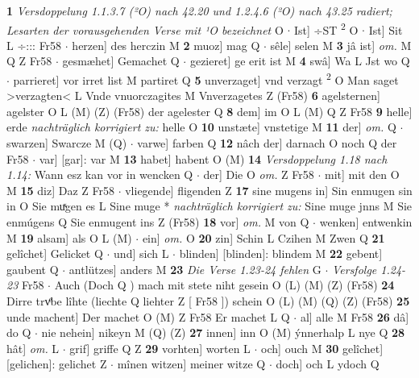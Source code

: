 \documentclass[8pt,a4paper,notitlepage]{article}
\begin{document}
\begin{table}[ht]
\begin{minipage}[t]{0.5\linewidth}
\textbf{1} \textit{Versdoppelung 1.1.3.7 (²O) nach 42.20 und 1.2.4.6 (²O) nach 43.25 radiert; Lesarten der vorausgehenden Verse mit ¹O bezeichnet} O   $\cdot$ Ist] ÷ST \textsuperscript{2}\hspace{-1.3mm} O  $\cdot$ Ist] Sit L ÷::: Fr58  $\cdot$ herzen] des herczin M \textbf{2} muoz] mag Q  $\cdot$ sêle] selen M \textbf{3} jâ ist] \textit{om.} M Q Z Fr58  $\cdot$ gesmæhet] Gemachet Q  $\cdot$ gezieret] ge erit ist M \textbf{4} swâ] Wa L Jst wo Q  $\cdot$ parrieret] vor irret list M partiret Q \textbf{5} unverzaget] vnd verzagt \textsuperscript{2}\hspace{-1.3mm} O Man saget >verzagten< L Vnde vnuorczagites M Vnverzagetes Z (Fr58) \textbf{6} agelsternen] agelster O L (M) (Z) (Fr58) der agelester Q \textbf{8} dem] im O L (M) Q Z Fr58 \textbf{9} helle] erde \textit{nachträglich korrigiert zu:} helle O \textbf{10} unstæte] vnstetige M \textbf{11} der] \textit{om.} Q  $\cdot$ swarzen] Swarcze M (Q)  $\cdot$ varwe] farben Q \textbf{12} nâch der] darnach O noch Q der Fr58  $\cdot$ var] [gar]: var M \textbf{13} habet] habent O (M) \textbf{14} \textit{Versdoppelung 1.18 nach 1.14:} Wann esz kan vor in wencken Q   $\cdot$ der] Die O \textit{om.} Z Fr58  $\cdot$ mit] mit den O M \textbf{15} diz] Daz Z Fr58  $\cdot$ vliegende] fligenden Z \textbf{17} sine mugens in] Sin enmugen sin in O Sie muͯgen es L Sine muge * \textit{nachträglich korrigiert zu:} Sine muge jnns M Sie enmúgens Q Sie enmugent ins Z (Fr58) \textbf{18} vor] \textit{om.} M von Q  $\cdot$ wenken] entwenkin M \textbf{19} alsam] als O L (M)  $\cdot$ ein] \textit{om.} O \textbf{20} zin] Schin L Czihen M Zwen Q \textbf{21} gelîchet] Gelicket Q  $\cdot$ und] sich L  $\cdot$ blinden] [blinden]: blindem M \textbf{22} gebent] gaubent Q  $\cdot$ antlützes] anders M \textbf{23} \textit{Die Verse 1.23-24 fehlen} G   $\cdot$ \textit{Versfolge 1.24-23} Fr58   $\cdot$ Auch (Doch Q ) mach mit stete niht gesein O (L) (M) (Z) (Fr58) \textbf{24} Dirre trvͤbe lîhte (liechte Q liehter Z [ Fr58 ]) schein O (L) (M) (Q) (Z) (Fr58) \textbf{25} unde machent] Der machet O (M) Z Fr58 Er machet L Q  $\cdot$ al] alle M Fr58 \textbf{26} dâ] do Q  $\cdot$ nie nehein] nikeyn M (Q) (Z) \textbf{27} innen] inn O (M) ýnnerhalp L nye Q \textbf{28} hât] \textit{om.} L  $\cdot$ grif] griffe Q Z \textbf{29} vorhten] worten L  $\cdot$ och] ouch M \textbf{30} gelîchet] [gelichen]: gelichet Z  $\cdot$ mînen witzen] meiner witze Q  $\cdot$ doch] och L ydoch Q \newline
\end{minipage}
\hspace{0.5cm}

\end{table}
\end{document}
